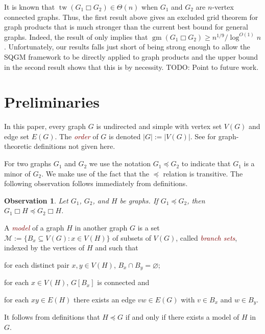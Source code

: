 \documentclass[kpfonts,lotsofwhite]{patmorin}
\newcommand{\defn}[1]{\textcolor{Maroon}{\emph{#1}}}
\newcommand{\boxprod}{\mathbin{\Box}}
\renewcommand{\emptyset}{\varnothing}
\renewcommand{\ge}{\geqslant}
\DeclareMathOperator{\tw}{tw}
\DeclareMathOperator{\gm}{gm}
\theoremstyle{plain}
\newtheorem{obs}[thm]{Observation}
\theoremstyle{definition}
\begin{document}
It is known that $\tw(G_1\boxprod G_2)\in\Theta(n)$ when $G_1$ and $G_2$ are $n$-vertex connected graphs.  Thus, the first result above gives an excluded grid theorem for graph products that is much stronger than the current best bound for general graphs. Indeed, the result of \cite{CT19} only implies that $\gm(G_1\boxprod G_2) \ge n^{1/9}/\log^{O(1)} n$.  Unfortunately, our results falls just short of being strong enough to allow the SQGM framework to be directly applied to graph products and the upper bound in the second result shows that this is by necessity.  TODO: Point to future work.

\section{Preliminaries}

In this paper, every graph $G$ is undirected and simple with vertex set $V(G)$ and edge set $E(G)$. The \defn{order} of $G$ is denoted $|G|:=|V(G)|$.
 See \citet{D10} for graph-theoretic definitions not given here.




For two graphs $G_1$ and $G_2$ we use the notation $G_1\preceq G_2$ to indicate that $G_1$ is a minor of $G_2$.  We make use of the fact that the $\preceq$ relation is transitive. The following observation follows immediately from definitions.

\begin{obs}\label{minor_product}
  Let $G_1$, $G_2$, and $H$ be graphs.  If $G_1\preceq G_2$, then $G_1\boxprod H\preceq G_2\boxprod H$.
\end{obs}

A \defn{model} of a graph $H$ in another graph $G$ is a set $\mathcal{M}:=\{B_x\subseteq V(G): x\in V(H)\}$ of subsets of $V(G)$, called \defn{branch sets}, indexed by the vertices of $H$ and such that
\begin{compactenum}[(i)]
  \item for each distinct pair $x,y\in V(H)$, $B_x\cap B_y=\emptyset$;
  \item for each $x\in V(H)$, $G[B_x]$ is connected and
  \item for each $xy\in E(H)$ there exists an edge $vw\in E(G)$ with $v\in B_x$ and $w\in B_y$.
\end{compactenum}
It follows from definitions that $H\preceq G$ if and only if there exists a model of $H$ in $G$.
\end{document}
